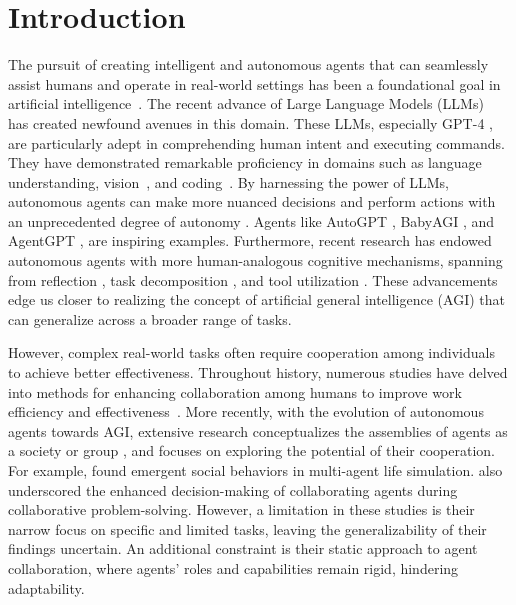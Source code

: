 \section{Introduction}
\label{sec:introduction}



The pursuit of creating intelligent and autonomous agents that can seamlessly assist humans and operate in real-world settings has been a foundational goal in artificial intelligence~\citep{wooldridge1995intelligent,Minsky88,bubeck2023sparks}. 
The recent advance of Large Language Models (LLMs)~\citep{DBLP:journals/corr/abs-2303-08774,DBLP:journals/corr/abs-2305-10403,DBLP:journals/corr/abs-2307-09288} has created newfound avenues in this domain. These LLMs, especially GPT-4 \citep{DBLP:journals/corr/abs-2303-08774}, are particularly adept in comprehending human intent and executing commands. They have demonstrated remarkable proficiency in domains such as language understanding, vision~\citep{OpenAI_ChatGPT}, and coding~\citep{bubeck2023sparks}. 
By harnessing the power of LLMs, autonomous agents can make more nuanced decisions and perform actions with an unprecedented degree of autonomy \citep{DBLP:journals/corr/abs-2307-13854}. Agents like AutoGPT \citep{richards2023auto}, BabyAGI \citep{nakajima2023babyagi}, and AgentGPT \citep{agentgpt}, are inspiring examples. Furthermore, recent research has endowed autonomous agents with more human-analogous cognitive mechanisms, spanning from reflection \citep{yao2023react,shinn2023reflexion}, task decomposition \citep{wei2023chainofthought,yao2023tree}, and tool utilization \citep{schick2023toolformer,qin2023tool,qin2023toolllm,qian2023creator}. These advancements edge us closer to realizing the concept of artificial general intelligence (AGI) \citep{goertzel2007artificial,clune2020aigas} that can generalize across a broader range of tasks.




However, complex real-world tasks often require cooperation among individuals to achieve better effectiveness. Throughout history, numerous studies have delved into methods for enhancing collaboration among humans to improve work efficiency and effectiveness~\citep{collectiveintelligence,fehr2000cooperation}. More recently, with the evolution of autonomous agents towards AGI, extensive research conceptualizes the assemblies of agents as a society or group \citep{DBLP:journals/corr/abs-2303-17760}, and focuses on exploring the potential of their cooperation. For example, \cite{DBLP:journals/corr/abs-2304-03442} found emergent social behaviors in multi-agent life simulation. \cite{DuMultiagentDebate,wang2023unleashing,zhang2023building,DBLP:journals/corr/abs-2307-07924,chan2023chateval} also underscored the enhanced decision-making of collaborating agents during collaborative problem-solving. 
However, a limitation in these studies is their narrow focus on specific and limited tasks, leaving the generalizability of their findings uncertain. An additional constraint is their static approach to agent collaboration, where agents' roles and capabilities remain rigid, hindering adaptability.



